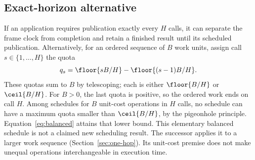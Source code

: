 \subsection{Exact-horizon alternative}
If an application requires publication exactly every $H$ calls, it can separate
the frame clock from completion and retain a finished result until its scheduled
publication. Alternatively, for an ordered sequence of $B$ work units, assign
call $s\in\{1,\ldots,H\}$ the quota
\begin{equation}
 q_s=\floor{sB/H}-\floor{(s-1)B/H}.
 \label{eq:balanced}
\end{equation}
These quotas sum to $B$ by telescoping; each is either $\floor{B/H}$ or
$\ceil{B/H}$. For $B>0$, the last quota is positive, so the ordered work ends
on call $H$. Among schedules for $B$ unit-cost operations in $H$ calls, no
schedule can have a maximum quota smaller than $\ceil{B/H}$, by the pigeonhole
principle. Equation~\eqref{eq:balanced} attains that lower bound. This elementary
balanced schedule is not a claimed new scheduling result. The successor applies
it to a larger work sequence (Section~\ref{sec:one-hop}). Its unit-cost premise
does not make unequal operations interchangeable in execution time.


